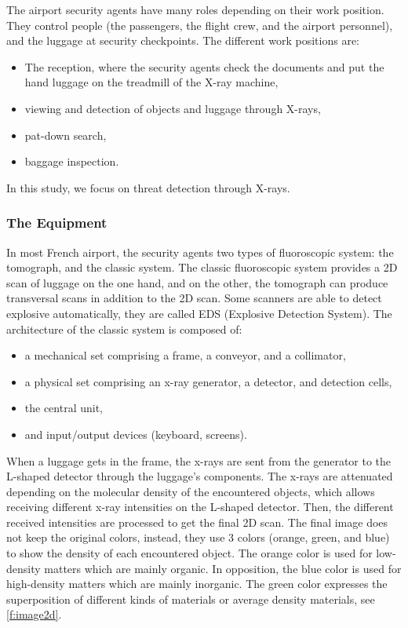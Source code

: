 The airport security agents have many roles depending on their work position. They control people (the passengers, the flight crew, and the airport personnel), and the luggage at security checkpoints. The different work positions are:
\begin{itemize}
\item The reception, where the security agents check the documents and put the hand luggage on the treadmill of the X-ray machine,
\item viewing and detection of objects and luggage through X-rays,
\item pat-down search,
\item baggage inspection.
\end{itemize}
In this study, we focus on threat detection through X-rays.

\subsubsection{The Equipment}

In most French airport, the security agents two types of fluoroscopic system: the tomograph, and the classic system. The classic fluoroscopic system provides a 2D scan of luggage on the one hand, and on the other, the tomograph can produce transversal scans in addition to the 2D scan. Some scanners are able to detect explosive automatically, they are called EDS (Explosive Detection System). The architecture of the classic system is composed of:
\begin{itemize}
\item a mechanical set comprising a frame, a conveyor, and a collimator,
\item a physical set comprising an x-ray generator, a detector, and detection cells,
\item the central unit,
\item and input/output devices (keyboard, screens).
\end{itemize}
When a luggage gets in the frame, the x-rays are sent from the generator to the L-shaped detector through the luggage's components. The x-rays are attenuated depending on the molecular density of the encountered objects, which allows receiving different x-ray intensities on the L-shaped detector. Then, the different received intensities are processed to get the final 2D scan.
The final image does not keep the original colors, instead, they use 3 colors (orange, green, and blue) to show the density of each encountered object. The orange color is used for low-density matters which are mainly organic. In opposition, the blue color is used for high-density matters which are mainly inorganic. The green color expresses the superposition of different kinds of materials or average density materials, see \autoref{f:image2d}.

